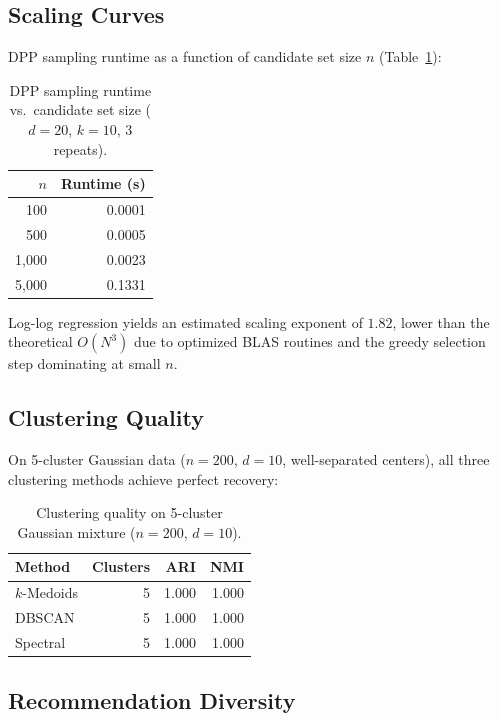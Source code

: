 \documentclass[11pt]{article}
\begin{document}
\subsection{Scaling Curves}

DPP sampling runtime as a function of candidate set size $n$
(Table~\ref{tab:scaling}):

\begin{table}[t]
\centering
\caption{DPP sampling runtime vs.\ candidate set size ($d{=}20$, $k{=}10$, 3 repeats).}
\label{tab:scaling}
\begin{tabular}{rr}
\toprule
$n$ & \textbf{Runtime (s)} \\
\midrule
100 & 0.0001 \\
500 & 0.0005 \\
1,000 & 0.0023 \\
5,000 & 0.1331 \\
\bottomrule
\end{tabular}
\end{table}

Log-log regression yields an estimated scaling exponent of $1.82$, lower than
the theoretical $O(N^3)$ due to optimized BLAS routines and the greedy
selection step dominating at small $n$.

\subsection{Clustering Quality}

On 5-cluster Gaussian data ($n{=}200$, $d{=}10$, well-separated centers),
all three clustering methods achieve perfect recovery:

\begin{table}[t]
\centering
\caption{Clustering quality on 5-cluster Gaussian mixture ($n{=}200$, $d{=}10$).}
\label{tab:clustering}
\begin{tabular}{lrrr}
\toprule
\textbf{Method} & \textbf{Clusters} & \textbf{ARI} & \textbf{NMI} \\
\midrule
$k$-Medoids & 5 & 1.000 & 1.000 \\
DBSCAN & 5 & 1.000 & 1.000 \\
Spectral & 5 & 1.000 & 1.000 \\
\bottomrule
\end{tabular}
\end{table}

\subsection{Recommendation Diversity}
\end{document}
